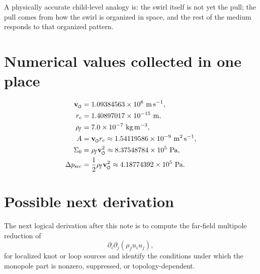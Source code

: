 \documentclass[11pt]{article}
\newcommand{\swirlarrow}{\mathchoice{\mkern-2mu\scriptstyle\boldsymbol{\circlearrowleft}}{\mkern-2mu\scriptstyle\boldsymbol{\circlearrowleft}}{\mkern-2mu\scriptscriptstyle\boldsymbol{\circlearrowleft}}{\mkern-2mu\scriptscriptstyle\boldsymbol{\circlearrowleft}}}
\newcommand{\vswirl}{\mathbf{v}_{\swirlarrow}}
\newcommand{\rhoF}{\rho_{\!f}}
\newcommand{\rc}{r_c}
\newcommand{\src}{\mathrm{src}}
\begin{document}
        A physically accurate child-level analogy is: the swirl itself is not yet the pull; the pull comes from how the swirl is organized in space, and the rest of the medium responds to that organized pattern.
        
        \appendix
        
        \section{Numerical values collected in one place}
        
        \begin{align}
            \vswirl &= 1.09384563\times 10^6\ \mathrm{m\,s^{-1}},
            \\
            \rc &= 1.40897017\times 10^{-15}\ \mathrm{m},
            \\
            \rhoF &= 7.0\times 10^{-7}\ \mathrm{kg\,m^{-3}},
            \\
            A &= \vswirl \rc \approx 1.54119586\times 10^{-9}\ \mathrm{m^2\,s^{-1}},
            \\
            \Sigma_0 &= \rhoF \vswirl^2 \approx 8.37548784\times 10^5\ \mathrm{Pa},
            \\
            \Delta p_{\src} &= \frac{1}{2}\rhoF \vswirl^2 \approx 4.18774392\times 10^5\ \mathrm{Pa}.
        \end{align}
        
        \section{Possible next derivation}
        
        The next logical derivation after this note is to compute the far-field multipole reduction of
        \[
            \partial_i\partial_j(\rhoF u_i u_j),
        \]
        for localized knot or loop sources and identify the conditions under which the monopole part is nonzero, suppressed, or topology-dependent.
        
\end{document}
